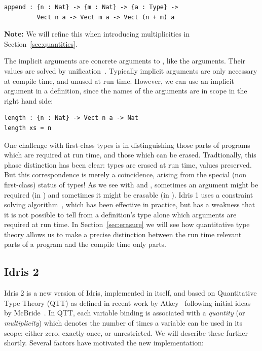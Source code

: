 \begin{lstlisting}
append : {n : Nat} -> {m : Nat} -> {a : Type} ->
         Vect n a -> Vect m a -> Vect (n + m) a
\end{lstlisting}

\textbf{Note:} We will refine this when introducing multiplicities in
Section~\ref{sec:quantities}.

The implicit arguments are concrete arguments to , like the
 arguments. Their values are solved by
unification~\cite{millerunification,gundrythesis}.  Typically implicit
arguments are only necessary at compile time, and unused at run time.
However, we can use an implicit argument in a definition, since
the names of the arguments are in scope in the right hand side:

\begin{lstlisting}
length : {n : Nat} -> Vect n a -> Nat
length xs = n
\end{lstlisting}

One challenge with first-class types is in distinguishing those parts of
programs which are required at run time, and those which can be erased.
Tradtionally, this phase distinction has been clear: types are erased at run
time, values preserved. But this correspondence is merely a coincidence,
arising from the special (non first-class) status of types! As we see with
 and , sometimes an argument might be required (in
) and sometimes it might be erasable (in ).
%
Idris 1 uses a constraint solving algorithm~\cite{matusicfp}, which has been
effective in practice, but has a weakness that it is not possible to tell from
a definition's type alone which arguments are required at run time.  In
Section~\ref{sec:erasure} we will see how quantitative type theory allows us to
make a precise distinction between the run time relevant parts of a program and
the compile time only parts.

\subsection{Idris 2}

\label{sec:idris2}

Idris 2 is a new version of Idris, implemented in itself, and based on
Quantitative Type Theory (QTT) as defined in recent work by Atkey~\cite{qtt}
following initial ideas by McBride~\cite{nuttin}. 
In QTT, each variable binding is associated with a \emph{quantity} (or
\emph{multiplicity}) which denotes the number of times a variable can be
used in its scope: either zero, exactly once, or unrestricted. We will
describe these further shortly. 
Several factors have motivated the new implementation:

